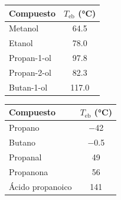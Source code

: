 \begin{center}
    {\small
    \begin{tabular}{@{}lc@{}}
        \toprule
        \textbf{Compuesto} & \textbf{\(T_\text{eb}\) (\unit{\degreeCelsius})} \\
        \midrule
        Metanol & \num{64.5} \\[3pt]
        Etanol & \num{78.0} \\[3pt]
        Propan-1-ol & \num{97.8} \\[3pt]
        Propan-2-ol & \num{82.3} \\[3pt]
        Butan-1-ol & \num{117.0} \\
        \bottomrule
    \end{tabular}
    }
    \qquad
    {\small
    \begin{tabular}{@{}lc@{}}
        \toprule
        \textbf{Compuesto} & \textbf{\(T_\text{eb}\) (\unit{\degreeCelsius})} \\
        \midrule
        Propano & \num{-42} \\[3pt]
        Butano & \num{-0.5} \\[3pt]
        Propanal & \num{49} \\[3pt]
        Propanona & \num{56} \\[3pt]
        Ácido propanoico & \num{141} \\
        \bottomrule
    \end{tabular}
    }
\end{center}

